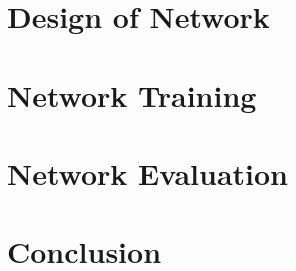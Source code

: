
\section*{Design of Network}

\section*{Network Training}

\section*{Network Evaluation}

\section*{Conclusion}
